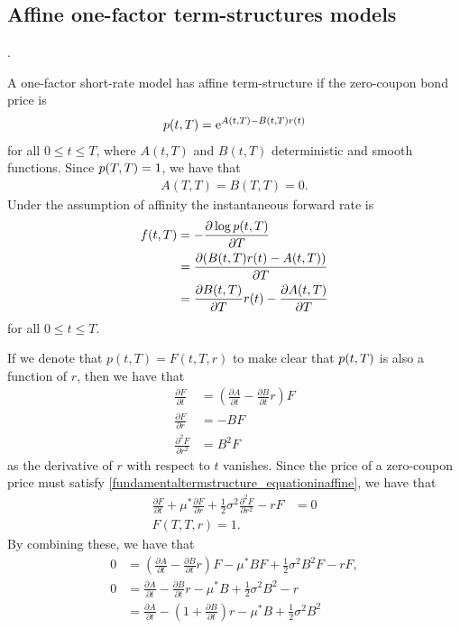 \subsection{Affine one-factor term-structures models}

 \textcite[pp. 329--331]{bjork2004arbitrage}.

A one-factor short-rate model has affine term-structure if the zero-coupon bond price is
\begin{align}
\label{affinitytermstructureequation}
p(t,T) = \mathrm{e}^{A(t,T) - B(t,T)r(t)}
\end{align}
for all $0 \leq t \leq T$, where $A(t,T)$ and $B(t,T)$ deterministic and smooth functions. Since $p(T,T) = 1$, we have that
\begin{align}
A(T,T) = B(T,T) = 0.
\end{align}
Under the assumption of affinity the instantaneous forward rate is
\begin{align}
f(t,T) &= - \frac{\partial \log p(t,T)}{\partial T} \\
&= \frac{\partial (B(t,T)r(t) - A(t,T))}{\partial T} \\
&= \frac{\partial B(t,T)}{\partial T}r(t) - \frac{\partial A(t,T)}{\partial T}
\end{align}
for all $0 \leq t \leq T$.

If we denote that $p(t,T) = F(t,T,r)$ to make clear that $p(t,T)$ is also a function of $r$, then we have that
\begin{align}
\frac{\partial F}{\partial t} &= \left( \frac{\partial A}{\partial t} - \frac{\partial B}{\partial t} r \right) F \\
\frac{\partial F}{\partial r} &= - B F \\
\frac{\partial^2 F}{\partial r^2} &= B^2 F
\end{align}
as the derivative of $r$ with respect to $t$ vanishes. Since the price of a zero-coupon price must satisfy \ref{fundamentaltermstructure_equationinaffine}, we have that
\begin{align}
\frac{\partial F}{\partial t} + \mu^* \frac{\partial F}{\partial r} + \frac{1}{2} \sigma^2 \frac{\partial^2 F}{\partial r^2} - r F &= 0 \\
F(T,T,r) = 1.
\end{align}
By combining these, we have that
\begin{align}
0 &= \left( \frac{\partial A}{\partial t} - \frac{\partial B}{\partial t} r \right) F - \mu^* B F + \frac{1}{2} \sigma^2 B^2 F - r F, \\
0 &= \frac{\partial A}{\partial t} - \frac{\partial B}{\partial t} r - \mu^* B + \frac{1}{2} \sigma^2 B^2 - r \\
&= \frac{\partial A}{\partial t} - ( 1 + \frac{\partial B}{\partial t} ) r - \mu^* B + \frac{1}{2} \sigma^2 B^2
\end{align}



